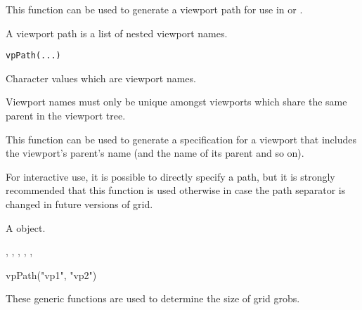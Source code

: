 %
\begin{Description}\relax
This function can be used to generate a viewport path for use
in  or .

A viewport path is a list of nested viewport names.
\end{Description}
%
\begin{Usage}
\begin{verbatim}
vpPath(...)
\end{verbatim}
\end{Usage}
%
\begin{Arguments}
\begin{ldescription}
\item[\code{...}]  Character values which are viewport names. 
\end{ldescription}
\end{Arguments}
%
\begin{Details}\relax
Viewport names must only be unique amongst viewports which
share the same parent in the viewport tree.

This function can be used to generate a specification for
a viewport that includes the viewport's parent's name
(and the name of its parent and so on).

For interactive use, it is possible to directly specify
a path, but it is strongly recommended that this function
is used otherwise in case the path separator is changed
in future versions of grid.
\end{Details}
%
\begin{Value}
A  object.
\end{Value}
%
\begin{SeeAlso}\relax
{},
,
,
,
,
\end{SeeAlso}
%
\begin{Examples}
\begin{ExampleCode}
vpPath("vp1", "vp2")
\end{ExampleCode}
\end{Examples}
%
\begin{Description}\relax
These generic functions are used to determine the size of grid grobs.
\end{Description}
